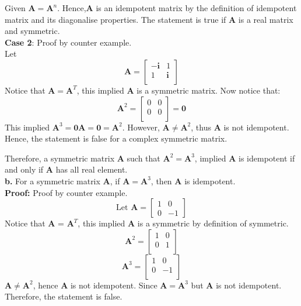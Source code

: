 \documentclass[12 pt, a4paper]{article}
\begin{document}
Given $\textbf{A}=\textbf{A}^{n}$. Hence,\textbf{A} is an idempotent matrix by the definition of idempotent matrix and its diagonalise properties.  The statement is true if \textbf{A} is a real matrix and symmetric.\\

\noindent \textbf{Case 2}: Proof by counter example. \\

\noindent Let \[ \textbf{A} = 
\begin{bmatrix}
- \textbf{i} & 1 \\
1 & \textbf{i} \\
\end{bmatrix}
\]
Notice that $\textbf{A} = \textbf{A}^T$, this implied \textbf{A} is a symmetric matrix.  Now notice that:
\[ \textbf{A}^2 = 
\begin{bmatrix}
0 & 0 \\
0 & 0 \\
\end{bmatrix}
= \textbf{0}
\]
This implied $\textbf{A}^3=\textbf{0A}=\textbf{0}=\textbf{A}^2$. However,  $\textbf{A} \neq \textbf{A}^2$, thus \textbf{A} is not idempotent.  Hence, the statement is false for a complex symmetric matrix. 

Therefore,   a symmetric matrix \textbf{A} such that $\textbf{A}^2=\textbf{A}^3$, implied \textbf{A} is idempotent if and only if \textbf{A} has all real element. \\


\noindent \textbf{b.} For a symmetric matrix \textbf{A}, if $\textbf{A}=\textbf{A}^3$, then \textbf{A} is idempotent.\\

\noindent \textbf{Proof:} Proof by counter example.
 \[ \text{Let }\textbf{A} =
\begin{bmatrix}
1 & 0 \\
0 & -1
\end{bmatrix}
\]
Notice that \textbf{A} = $\textbf{A}^T$,  this implied \textbf{A} is a symmetric by definition of symmetric.  \\
\[ \textbf{A}^2 = 
\begin{bmatrix}
1 & 0 \\
0 & 1 \\
\end{bmatrix}
\]
\[
\textbf{A}^3 = \begin{bmatrix}
1 & 0 \\
0 & -1 \\
\end{bmatrix}
\] 
$\textbf{A} \neq \textbf{A}^2$,  hence \textbf{A} is not idempotent.  Since $\textbf{A}=\textbf{A}^3$ but \textbf{A} is not idempotent. Therefore,  the statement is false.  
\end{document}
